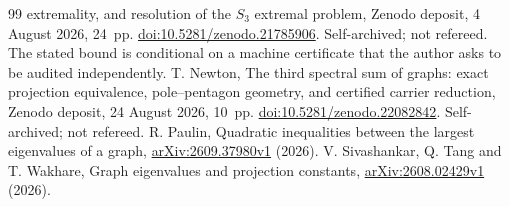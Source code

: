 \documentclass[11pt]{article}
\theoremstyle{remark}\newtheorem{remark}[theorem]{Remark}
\numberwithin{equation}{section}
\begin{document}
\begin{thebibliography}{99}
extremality, and resolution of the $S_3$ extremal problem,
Zenodo deposit, 4 August 2026, 24~pp.
\href{https://doi.org/10.5281/zenodo.21785906}{doi:10.5281/zenodo.21785906}.
Self-archived; not refereed. The stated bound is conditional on a machine
certificate that the author asks to be audited independently.
T. Newton,
The third spectral sum of graphs: exact projection equivalence,
pole--pentagon geometry, and certified carrier reduction,
Zenodo deposit, 24 August 2026, 10~pp.
\href{https://doi.org/10.5281/zenodo.22082842}{doi:10.5281/zenodo.22082842}.
Self-archived; not refereed.
R. Paulin,
Quadratic inequalities between the largest eigenvalues of a graph,
\href{https://arxiv.org/abs/2609.37980v1}{arXiv:2609.37980v1} (2026).
V. Sivashankar, Q. Tang and T. Wakhare,
Graph eigenvalues and projection constants,
\href{https://arxiv.org/abs/2608.02429v1}{arXiv:2608.02429v1} (2026).
\end{thebibliography}
\end{document}
